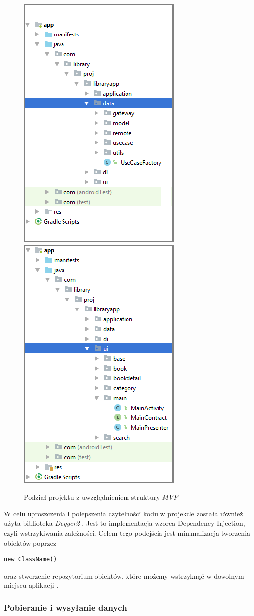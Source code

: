 \documentclass[twoside]{projektInzynierskiMS}
\begin{document}
\begin{figure}[h]
  \centering
  \includegraphics[width=0.4\linewidth]{img/android/mvpData.png}
  \includegraphics[width=0.4\linewidth]{img/android/mvpMainActivity.png}
  \caption{Podział projektu z uwzględnieniem struktury \textit{MVP}}
  \label{fig:mvpProject}
\end{figure}

W celu uproszczenia i polepszenia czytelności kodu w projekcie została również użyta biblioteka \textit{Dagger2} \cite{dagger2}.
Jest to implementacja wzorca Dependency Injection, czyli wstrzykiwania zależności. Celem tego podejścia jest minimalizacja tworzenia obiektów poprzez 
\begin{verbatim}
new ClassName()
\end{verbatim}
oraz stworzenie repozytorium obiektów, które możemy wstrzyknąć w
dowolnym miejscu aplikacji \cite{PPPAndroida}.

\subsubsection{Pobieranie i wysyłanie danych}
\end{document}
